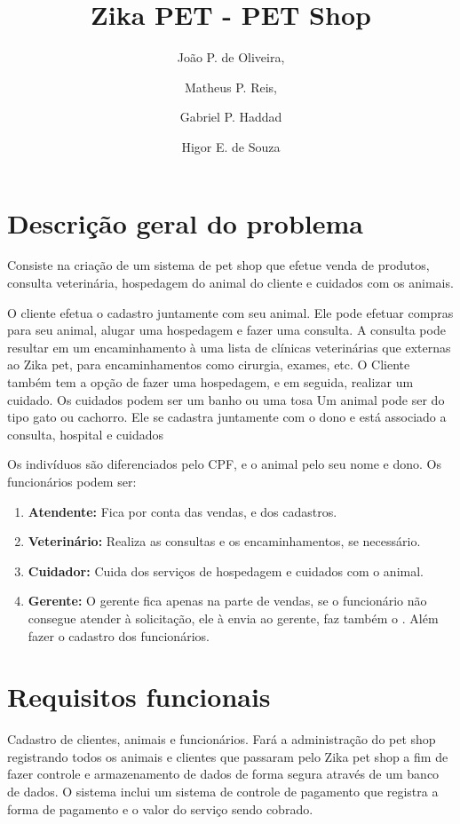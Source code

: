 \documentclass[12pt]{article}
\begin{document}
 \title{Zika PET - PET Shop}
\author{
	João P. de Oliveira,
    \and
    Matheus P. Reis,
    \and
     Gabriel P. Haddad
    \and
    Higor E. de Souza
}
  \newpage                 
 \maketitle
 \newpage                 %
 \tableofcontents         %
  \newpage                 %
 \section{Descrição geral do problema}
 Consiste na criação de um sistema de pet shop que efetue venda de produtos, consulta veterinária, hospedagem do animal do cliente e cuidados com os animais.
 
 O cliente efetua o cadastro juntamente com seu animal. Ele pode efetuar compras para seu animal, alugar uma hospedagem e fazer uma consulta. A consulta pode resultar em um encaminhamento à uma lista de clínicas veterinárias que externas ao Zika pet, para encaminhamentos como cirurgia, exames, etc. 
 O Cliente também tem a opção de fazer uma hospedagem, e em seguida, realizar um cuidado. Os cuidados podem ser um banho ou uma tosa 
 Um animal pode ser do tipo gato ou cachorro. Ele se cadastra juntamente com o  dono e está associado a consulta, hospital e cuidados
 
 Os indivíduos são diferenciados pelo CPF, e o animal pelo seu nome e dono. Os funcionários podem ser:
 
\begin{enumerate}
\item \textbf{Atendente:} Fica por conta das vendas, e dos cadastros.

\item \textbf{Veterinário:} Realiza as consultas e os encaminhamentos, se necessário.

\item \textbf{Cuidador:} Cuida dos serviços de hospedagem e cuidados com o animal.

\item \textbf{Gerente:} O gerente fica apenas na parte de vendas, se o funcionário não consegue atender à solicitação, ele à envia ao gerente, faz também o . Além fazer o cadastro dos funcionários.
\end{enumerate}
 
 \section{Requisitos funcionais}%
 Cadastro de clientes, animais e funcionários. Fará a administração do pet shop registrando todos os animais e clientes que passaram pelo Zika pet shop a fim de fazer controle e armazenamento de dados de forma segura através de um banco de dados. O sistema inclui um sistema de controle de pagamento que registra a forma de pagamento e o valor do serviço sendo cobrado.
 
\end{document}
